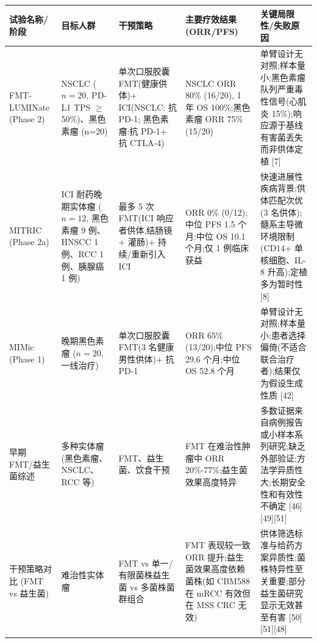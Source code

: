 \documentclass[11pt]{article}
\newcounter{none}
\begin{document}
{\def\LTcaptype{none} %
\begin{longtable}[]{@{}
  >{\raggedright\arraybackslash}p{}
  >{\raggedright\arraybackslash}p{}
  >{\raggedright\arraybackslash}p{}
  >{\raggedright\arraybackslash}p{}
  >{\raggedright\arraybackslash}p{}@{}}
\toprule\noalign{}
\begin{minipage}[b]{\linewidth}\raggedright
试验名称/阶段
\end{minipage} & \begin{minipage}[b]{\linewidth}\raggedright
目标人群
\end{minipage} & \begin{minipage}[b]{\linewidth}\raggedright
干预策略
\end{minipage} & \begin{minipage}[b]{\linewidth}\raggedright
主要疗效结果 (ORR/PFS)
\end{minipage} & \begin{minipage}[b]{\linewidth}\raggedright
关键局限性/失败原因
\end{minipage} \\
\midrule\noalign{}
\endhead
\bottomrule\noalign{}
\endlastfoot
FMT-LUMINate (Phase 2) & NSCLC (\(n=20\), PD-L1 TPS \(\geq\) 50\%)、黑色素瘤 (n=20) & 单次口服胶囊 FMT(健康供体)+ ICI(NSCLC: 抗 PD-1; 黑色素瘤:抗 PD-1+ 抗 CTLA-4) & NSCLC ORR 80\% (16/20), 1 年 OS 100\%;黑色素瘤 ORR 75\% (15/20) & 单臂设计无对照;样本量小;黑色素瘤队列严重毒性信号(心肌炎 15\%);响应源于基线有害菌丢失而非供体定植 {[}7{]} \\
MITRIC (Phase 2a) & ICI 耐药晚期实体瘤 (\(n=12\), 黑色素瘤 9 例、HNSCC 1 例、RCC 1 例、胰腺癌 1 例) & 最多 5 次 FMT(ICI 响应者供体,结肠镜 + 灌肠)+ 持续/重新引入 ICI & ORR 0\% (0/12);中位 PFS 1.5 个月;中位 OS 10.1 个月;仅 1 例临床获益 & 快速进展性疾病背景;供体匹配次优(3 名供体);髓系主导微环境限制(CD14+ 单核细胞、IL-8 升高);定植多为暂时性 {[}8{]} \\
MIMic (Phase 1) & 晚期黑色素瘤 (\(n=20\), 一线治疗) & 单次口服胶囊 FMT(3 名健康男性供体)+ 抗 PD-1 & ORR 65\% (13/20);中位 PFS 29.6 个月;中位 OS 52.8 个月 & 单臂设计无对照;样本量小;患者选择偏倚(不适合联合治疗者);结果仅为假设生成性质 {[}42{]} \\
早期 FMT/益生菌综述 & 多种实体瘤(黑色素瘤、NSCLC、RCC 等) & FMT、益生菌、饮食干预 & FMT 在难治性肿瘤中 ORR 20\%-77\%;益生菌效果高度特异 & 多数证据来自病例报告或小样本系列研究;缺乏外部验证;方法学异质性大;长期安全性和有效性不确定 {[}46{]}{[}49{]}{[}51{]} \\
干预策略对比 (FMT vs 益生菌) & 难治性实体瘤 & FMT vs 单一/有限菌株益生菌 vs 多菌株菌群组合 & FMT 表现较一致 ORR 提升;益生菌效果高度依赖菌株(如 CBM588 在 mRCC 有效但在 MSS CRC 无效) & 供体筛选标准与给药方案异质性;菌株特异性至关重要;部分益生菌研究显示无效甚至有害 {[}50{]}{[}51{]}{[}48{]} \\
\end{longtable}
}
\end{document}

